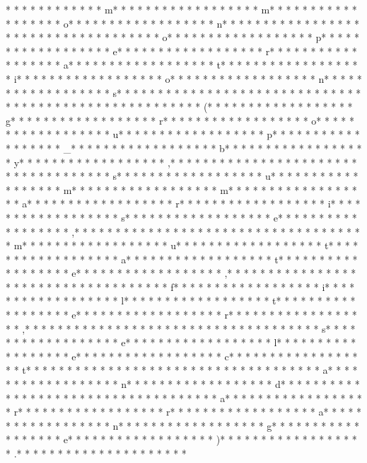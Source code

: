 * * *  *  * * *  *  * * *  * m* * *  * * *  * * *  *  * * *  *  * * *  * m* * *  * * *  * * *  *  * * *  *  * * *  * o* * *  * * *  * * *  *  * * *  *  * * *  * n* * *  * * *  * * *  *  * * *  *  * * *  *  * * *  * * *  * * *  *  * * *  *  * * *  * o* * *  * * *  * * *  *  * * *  *  * * *  * p* * *  * * *  * * *  *  * * *  *  * * *  * e* * *  * * *  * * *  *  * * *  *  * * *  * r* * *  * * *  * * *  *  * * *  *  * * *  * a* * *  * * *  * * *  *  * * *  *  * * *  * t* * *  * * *  * * *  *  * * *  *  * * *  * i* * *  * * *  * * *  *  * * *  *  * * *  * o* * *  * * *  * * *  *  * * *  *  * * *  * n* * *  * * *  * * *  *  * * *  *  * * *  * s* * *  * * *  * * *  *  * * *  *  * * *  *  * * *  * * *  * * *  *  * * *  *  * * *  *  * * *  * * *  * * *  *  * * *  *  * * *  * (* * *  * * *  * * *  *  * * *  *  * * *  * g* * *  * * *  * * *  *  * * *  *  * * *  * r* * *  * * *  * * *  *  * * *  *  * * *  * o* * *  * * *  * * *  *  * * *  *  * * *  * u* * *  * * *  * * *  *  * * *  *  * * *  * p* * *  * * *  * * *  *  * * *  *  * * *  * _* * *  * * *  * * *  *  * * *  *  * * *  * b* * *  * * *  * * *  *  * * *  *  * * *  * y* * *  * * *  * * *  *  * * *  *  * * *  * ,* * *  * * *  * * *  *  * * *  *  * * *  *  * * *  * * *  * * *  *  * * *  *  * * *  * s* * *  * * *  * * *  *  * * *  *  * * *  * u* * *  * * *  * * *  *  * * *  *  * * *  * m* * *  * * *  * * *  *  * * *  *  * * *  * m* * *  * * *  * * *  *  * * *  *  * * *  * a* * *  * * *  * * *  *  * * *  *  * * *  * r* * *  * * *  * * *  *  * * *  *  * * *  * i* * *  * * *  * * *  *  * * *  *  * * *  * s* * *  * * *  * * *  *  * * *  *  * * *  * e* * *  * * *  * * *  *  * * *  *  * * *  * ,* * *  * * *  * * *  *  * * *  *  * * *  *  * * *  * * *  * * *  *  * * *  *  * * *  * m* * *  * * *  * * *  *  * * *  *  * * *  * u* * *  * * *  * * *  *  * * *  *  * * *  * t* * *  * * *  * * *  *  * * *  *  * * *  * a* * *  * * *  * * *  *  * * *  *  * * *  * t* * *  * * *  * * *  *  * * *  *  * * *  * e* * *  * * *  * * *  *  * * *  *  * * *  * ,* * *  * * *  * * *  *  * * *  *  * * *  *  * * *  * * *  * * *  *  * * *  *  * * *  * f* * *  * * *  * * *  *  * * *  *  * * *  * i* * *  * * *  * * *  *  * * *  *  * * *  * l* * *  * * *  * * *  *  * * *  *  * * *  * t* * *  * * *  * * *  *  * * *  *  * * *  * e* * *  * * *  * * *  *  * * *  *  * * *  * r* * *  * * *  * * *  *  * * *  *  * * *  * ,* * *  * * *  * * *  *  * * *  *  * * *  *  * * *  * * *  * * *  *  * * *  *  * * *  * s* * *  * * *  * * *  *  * * *  *  * * *  * e* * *  * * *  * * *  *  * * *  *  * * *  * l* * *  * * *  * * *  *  * * *  *  * * *  * e* * *  * * *  * * *  *  * * *  *  * * *  * c* * *  * * *  * * *  *  * * *  *  * * *  * t* * *  * * *  * * *  *  * * *  *  * * *  *  * * *  * * *  * * *  *  * * *  *  * * *  * a* * *  * * *  * * *  *  * * *  *  * * *  * n* * *  * * *  * * *  *  * * *  *  * * *  * d* * *  * * *  * * *  *  * * *  *  * * *  *  * * *  * * *  * * *  *  * * *  *  * * *  * a* * *  * * *  * * *  *  * * *  *  * * *  * r* * *  * * *  * * *  *  * * *  *  * * *  * r* * *  * * *  * * *  *  * * *  *  * * *  * a* * *  * * *  * * *  *  * * *  *  * * *  * n* * *  * * *  * * *  *  * * *  *  * * *  * g* * *  * * *  * * *  *  * * *  *  * * *  * e* * *  * * *  * * *  *  * * *  *  * * *  * )* * *  * * *  * * *  *  * * *  *  * * *  * .* * *  * * *  * * *  *  * * *  *  * * *  *  * * * 